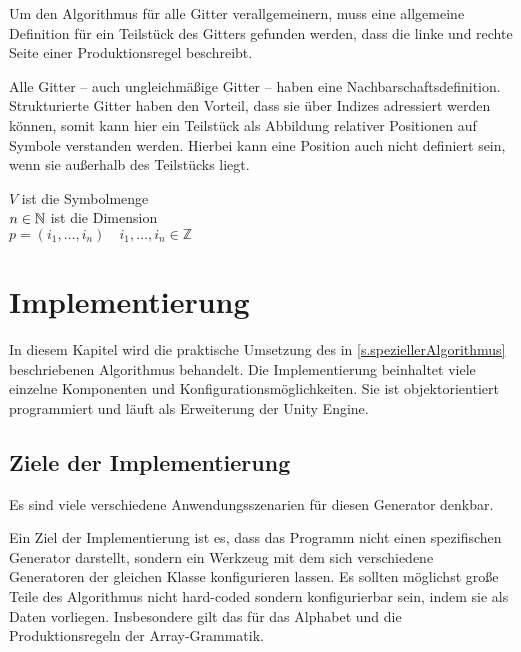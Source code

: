 Um den Algorithmus für alle Gitter verallgemeinern, muss eine allgemeine Definition für ein Teilstück des Gitters gefunden werden, dass die linke und rechte Seite einer Produktionsregel beschreibt. 

Alle Gitter -- auch ungleichmäßige Gitter -- haben eine Nachbarschaftsdefinition. Strukturierte Gitter haben den Vorteil, dass sie über Indizes adressiert werden können, somit kann hier ein Teilstück als Abbildung relativer Positionen auf Symbole verstanden werden. Hierbei kann eine Position auch nicht definiert sein, wenn sie außerhalb des Teilstücks liegt.

$ V $ ist die Symbolmenge \\
$ n \in \mathbb{N} $ ist die Dimension \\
$ p = (i_1, \dotsc , i_n) \quad i_1, \dotsc , i_n \in \mathbb{Z} $


\chapter{Implementierung}\label{c.implementierung}

In diesem Kapitel wird die praktische Umsetzung des in \ref{s.speziellerAlgorithmus} beschriebenen Algorithmus behandelt. Die Implementierung beinhaltet viele einzelne Komponenten und Konfigurationsmöglichkeiten. Sie ist objektorientiert programmiert und läuft als Erweiterung der Unity Engine. 



\section{Ziele der Implementierung}

Es sind viele verschiedene Anwendungsszenarien für diesen Generator denkbar. 

Ein Ziel der Implementierung ist es, dass das Programm nicht einen spezifischen Generator darstellt, sondern ein Werkzeug mit dem sich verschiedene Generatoren der gleichen Klasse konfigurieren lassen. Es sollten möglichst große Teile des Algorithmus nicht hard-coded sondern konfigurierbar sein, indem sie als Daten vorliegen. Insbesondere gilt das für das Alphabet und die Produktionsregeln der Array-Grammatik.

